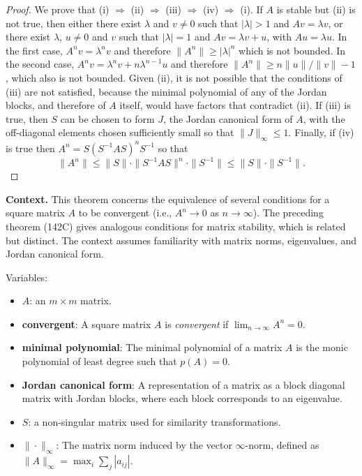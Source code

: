 \begin{proof}
We prove that (i) \(\Rightarrow\) (ii) \(\Rightarrow\) (iii) \(\Rightarrow\) (iv) \(\Rightarrow\) (i). If \( A \) is stable but (ii) is not true, then either there exist \( \lambda \) and \( v \neq 0 \) such that \( |\lambda| > 1 \) and \( Av = \lambda v \), or there exist \( \lambda \), \( u \neq 0 \) and \( v \) such that \( |\lambda| = 1 \) and \( Av = \lambda v + u \), with \( Au = \lambda u \). In the first case, \( A^{n} v = \lambda^{n} v \) and therefore \( \| A^{n} \| \geq |\lambda|^{n} \) which is not bounded. In the second case, \( A^{n} v = \lambda^{n} v + n \lambda^{n-1} u \) and therefore \( \| A^{n} \| \geq n \| u \| / \| v \| - 1 \), which also is not bounded. Given (ii), it is not possible that the conditions of (iii) are not satisfied, because the minimal polynomial of any of the Jordan blocks, and therefore of \( A \) itself, would have factors that contradict (ii). If (iii) is true, then \( S \) can be chosen to form \( J \), the Jordan canonical form of \( A \), with the off-diagonal elements chosen sufficiently small so that \( \| J \|_{\infty} \leq 1 \). Finally, if (iv) is true then \( A^{n} = S (S^{-1} A S)^{n} S^{-1} \) so that
\[
\| A^{n} \| \leq \| S \| \cdot \| S^{-1} A S \|^{n} \cdot \| S^{-1} \| \leq \| S \| \cdot \| S^{-1} \|.
\]
\end{proof}

\noindent\textbf{Context.}
This theorem concerns the equivalence of several conditions for a square matrix \(A\) to be convergent (i.e., \(A^{n} \to 0\) as \(n\to\infty\)). The preceding theorem (142C) gives analogous conditions for matrix stability, which is related but distinct. The context assumes familiarity with matrix norms, eigenvalues, and Jordan canonical form.

Variables:
\begin{itemize}
    \item \(A\): an \(m \times m\) matrix.
    \item \textbf{convergent}: A square matrix \(A\) is \emph{convergent} if \(\lim_{n\to\infty} A^{n} = 0\).
    \item \textbf{minimal polynomial}: The minimal polynomial of a matrix \(A\) is the monic polynomial of least degree such that \(p(A) = 0\).
    \item \textbf{Jordan canonical form}: A representation of a matrix as a block diagonal matrix with Jordan blocks, where each block corresponds to an eigenvalue.
    \item \(S\): a non-singular matrix used for similarity transformations.
    \item \(\|\cdot\|_{\infty}\): The matrix norm induced by the vector \(\infty\)-norm, defined as \(\|A\|_{\infty} = \max_{i} \sum_{j} |a_{ij}|\).
\end{itemize}

